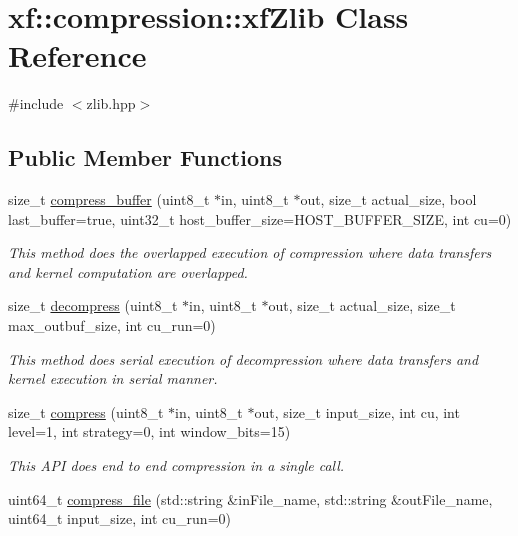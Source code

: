 \hypertarget{classxf_1_1compression_1_1xfZlib}{\section{xf\-:\-:compression\-:\-:xf\-Zlib Class Reference}
\label{classxf_1_1compression_1_1xfZlib}
}


{\ttfamily \#include $<$zlib.\-hpp$>$}

\subsection*{Public Member Functions}
\begin{DoxyCompactItemize}
\item 
size\-\_\-t \hyperlink{classxf_1_1compression_1_1xfZlib_ab52ee4c6869563448f489cd3c81dd2da}{compress\-\_\-buffer} (uint8\-\_\-t $\ast$in, uint8\-\_\-t $\ast$out, size\-\_\-t actual\-\_\-size, bool last\-\_\-buffer=true, uint32\-\_\-t host\-\_\-buffer\-\_\-size=H\-O\-S\-T\-\_\-\-B\-U\-F\-F\-E\-R\-\_\-\-S\-I\-Z\-E, int cu=0)
\begin{DoxyCompactList}\small\item\em This method does the overlapped execution of compression where data transfers and kernel computation are overlapped. \end{DoxyCompactList}\item 
size\-\_\-t \hyperlink{classxf_1_1compression_1_1xfZlib_a5dc1443008daebba8e3aa47c1962434a}{decompress} (uint8\-\_\-t $\ast$in, uint8\-\_\-t $\ast$out, size\-\_\-t actual\-\_\-size, size\-\_\-t max\-\_\-outbuf\-\_\-size, int cu\-\_\-run=0)
\begin{DoxyCompactList}\small\item\em This method does serial execution of decompression where data transfers and kernel execution in serial manner. \end{DoxyCompactList}\item 
size\-\_\-t \hyperlink{classxf_1_1compression_1_1xfZlib_aed3a52d3bcb4e2603d367a559c85e175}{compress} (uint8\-\_\-t $\ast$in, uint8\-\_\-t $\ast$out, size\-\_\-t input\-\_\-size, int cu, int level=1, int strategy=0, int window\-\_\-bits=15)
\begin{DoxyCompactList}\small\item\em This A\-P\-I does end to end compression in a single call. \end{DoxyCompactList}\item 
uint64\-\_\-t \hyperlink{classxf_1_1compression_1_1xfZlib_a4dae7f3471aa3788ffc0c11a9b6196fc}{compress\-\_\-file} (std\-::string \&in\-File\-\_\-name, std\-::string \&out\-File\-\_\-name, uint64\-\_\-t input\-\_\-size, int cu\-\_\-run=0)

\end{DoxyCompactItemize}
